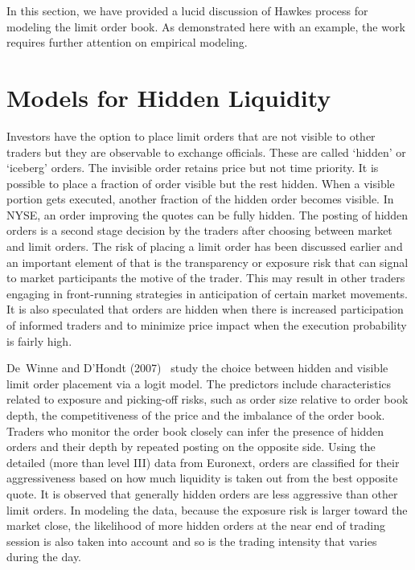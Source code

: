 In this section, we have provided a lucid discussion of Hawkes process for modeling the limit order book. As demonstrated here with an example, the work requires further attention on empirical modeling. \label{in:hawk2}



\section{Models for Hidden Liquidity\label{sec:model_hidden}} \label{in:hidden2}

Investors have the option to place limit orders that are not visible to other traders but they are observable to exchange officials. These are called `hidden' or `iceberg' orders. The invisible order retains price but not time priority. It is possible to place a fraction of order visible but the rest hidden. When a visible portion gets executed, another fraction of the hidden order becomes visible. In NYSE, an order improving the quotes can be fully hidden. The posting of hidden orders is a second stage decision by the traders after choosing between market and limit orders. The risk of placing a limit order has been discussed earlier and an important element of that is the transparency or exposure risk that can signal to market participants the motive of the trader. This may result in other traders engaging in front-running strategies in anticipation of certain market movements. It is also speculated that orders are hidden when there is increased participation of informed traders and to minimize price impact when the execution probability is fairly high. 


De~Winne and D'Hondt (2007)~\cite{winne} study the choice between hidden and visible limit order placement via a logit model. The predictors include characteristics related to exposure and picking-off risks, such as order size relative to order book depth, the competitiveness of the price and the imbalance of the order book. Traders who monitor the order book closely can infer the presence of hidden orders and their depth by repeated posting on the opposite side. Using the detailed (more than level III) data from Euronext, orders are classified for their aggressiveness based on how much liquidity is taken out from the best opposite quote. It is observed that generally hidden orders are less aggressive than other limit orders. In modeling the data, because the exposure risk is larger toward the market close, the likelihood of more hidden orders at the near end of trading session is also taken into account and so is the trading intensity that varies during the day. 


